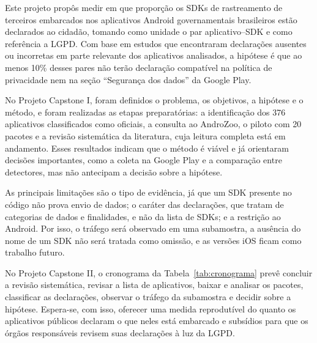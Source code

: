 \label{sec:conclusao}

Este projeto propôs medir em que proporção os SDKs de rastreamento de terceiros embarcados nos aplicativos Android governamentais brasileiros estão declarados ao cidadão, tomando como unidade o par aplicativo--SDK e como referência a LGPD. Com base em estudos que encontraram declarações ausentes ou incorretas em parte relevante dos aplicativos analisados, a hipótese é que ao menos 10\% desses pares não terão declaração compatível na política de privacidade nem na seção ``Segurança dos dados'' da Google Play.

No Projeto Capstone I, foram definidos o problema, os objetivos, a hipótese e o método, e foram realizadas as etapas preparatórias: a identificação dos 376 aplicativos classificados como oficiais, a consulta ao AndroZoo, o piloto com 20 pacotes e a revisão sistemática da literatura, cuja leitura completa está em andamento. Esses resultados indicam que o método é viável e já orientaram decisões importantes, como a coleta na Google Play e a comparação entre detectores, mas não antecipam a decisão sobre a hipótese.

As principais limitações são o tipo de evidência, já que um SDK presente no código não prova envio de dados; o caráter das declarações, que tratam de categorias de dados e finalidades, e não da lista de SDKs; e a restrição ao Android. Por isso, o tráfego será observado em uma subamostra, a ausência do nome de um SDK não será tratada como omissão, e as versões iOS ficam como trabalho futuro.

No Projeto Capstone II, o cronograma da Tabela~\ref{tab:cronograma} prevê concluir a revisão sistemática, revisar a lista de aplicativos, baixar e analisar os pacotes, classificar as declarações, observar o tráfego da subamostra e decidir sobre a hipótese. Espera-se, com isso, oferecer uma medida reprodutível do quanto os aplicativos públicos declaram o que neles está embarcado e subsídios para que os órgãos responsáveis revisem suas declarações à luz da LGPD.
